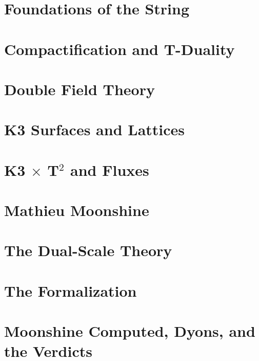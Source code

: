 \documentclass[11pt,twoside,openright]{book}
\begin{document}
\frontmatter

\tableofcontents
\mainmatter
\part{Foundations of the String}






\part{Compactification and T-Duality}







\part{Double Field Theory}




\part{K3 Surfaces and Lattices}






\part{K3 $\times$ T$^2$ and Fluxes}




\part{Mathieu Moonshine}



\part{The Dual-Scale Theory}



\part{The Formalization}





\part{Moonshine Computed, Dyons, and the Verdicts}



\appendix

\backmatter

\printindex
\end{document}
